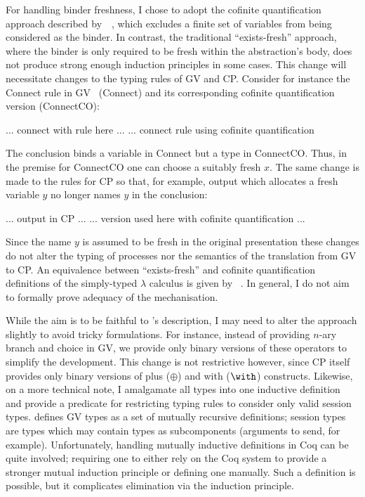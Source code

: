 \documentclass{mprop}
\begin{document}
For handling binder freshness, I chose to adopt the cofinite quantification
approach described by~\cite{Aydemir:2008:EFM}~\cite{Aydemir:2008:EFM}, which
excludes a finite set of variables from being considered as the binder. In
contrast, the traditional ``exists-fresh'' approach, where the binder is only
required to be fresh within the abstraction's body, does not produce strong
enough induction principles in some cases. This change will necessitate
changes to the typing rules of GV and CP. Consider for instance the Connect
rule in GV~\cite{Wadler:2014} (Connect) and its corresponding cofinite
quantification version (ConnectCO):

... connect with rule here ... ... connect rule using cofinite quantification

The conclusion binds a variable in Connect but a type in ConnectCO. Thus, in
the premise for ConnectCO one can choose a suitably fresh $x$. The same change is made to the rules for CP so that, for example, output which allocates a fresh variable $y$ no longer names $y$ in the conclusion:

... output in CP ... ... version used here with cofinite quantification ...

Since the name $y$ is assumed to be fresh in the original presentation these
changes do not alter the typing of processes nor the semantics of the
translation from GV to CP. An equivalence between ``exists-fresh'' and
cofinite quantification definitions of the simply-typed $\lambda$ calculus is
given by \citeauthor{Aydemir:2008:EFM}~\cite{Aydemir:2008:EFM}. In general, I
do not aim to formally prove adequacy of the mechanisation.

While the aim is to be faithful to \citeauthor{Wadler:2014}'s description, I
may need to alter the approach slightly to avoid tricky formulations. For
instance, instead of providing $n$-ary branch and choice in GV, we provide
only binary versions of these operators to simplify the development. This
change is not restrictive however, since CP itself provides only binary
versions of plus ($\oplus$) and with ($\with$) constructs. Likewise, on a more
technical note, I amalgamate all types into one inductive definition and
provide a predicate for restricting typing rules to consider only valid
session types. \citeauthor{Wadler:2014} defines GV types as a set of mutually
recursive definitions; session types are types which may contain types as
subcomponents (arguments to send, for example). Unfortunately, handling
mutually inductive definitions in Coq can be quite involved; requiring one to
either rely on the Coq system to provide a stronger mutual induction principle
or defining one manually. Such a definition is possible, but it complicates
elimination via the induction principle.
\end{document}
